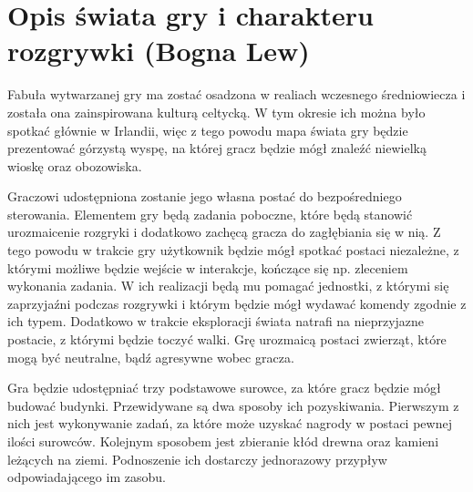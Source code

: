 \section{Opis świata gry i charakteru rozgrywki (Bogna Lew)}\label{s:swiat}
Fabuła wytwarzanej gry ma zostać osadzona w realiach wczesnego średniowiecza i została ona zainspirowana kulturą celtycką.
W tym okresie ich można było spotkać głównie w Irlandii, więc z tego powodu mapa świata gry będzie prezentować górzystą wyspę, na
której gracz będzie mógł znaleźć niewielką wioskę oraz obozowiska.

Graczowi udostępniona zostanie jego własna postać do bezpośredniego sterowania. Elementem gry będą zadania
poboczne, które będą stanowić urozmaicenie rozgryki i dodatkowo zachęcą gracza do
zagłębiania się w nią. Z tego powodu w trakcie gry użytkownik będzie mógł spotkać postaci niezależne, z którymi możliwe
będzie wejście w interakcje, kończące się np. zleceniem wykonania zadania. W ich realizacji będą mu pomagać jednostki,
z którymi się zaprzyjaźni podczas rozgrywki i którym będzie mógł wydawać komendy zgodnie z ich typem. Dodatkowo w
trakcie eksploracji świata natrafi na nieprzyjazne postacie, z którymi będzie toczyć walki. Grę urozmaicą postaci
zwierząt, które mogą być neutralne, bądź agresywne wobec gracza.

Gra będzie udostępniać trzy podstawowe surowce, za które gracz będzie mógł budować budynki. Przewidywane są dwa sposoby
ich pozyskiwania. Pierwszym z nich jest wykonywanie zadań, za które może uzyskać nagrody w postaci pewnej ilości
surowców. Kolejnym sposobem jest zbieranie kłód drewna oraz kamieni leżących na ziemi. Podnoszenie ich dostarczy
jednorazowy przypływ odpowiadającego im zasobu.
